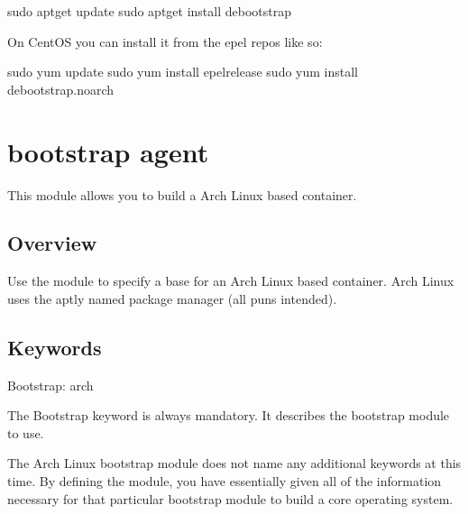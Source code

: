 \documentclass[letterpaper,10pt,english]{sphinxmanual}
\begin{document}
%
\begin{sphinxVerbatim}[commandchars=\\\{\}]
\PYGZdl{} sudo apt\PYGZhy{}get update \PYGZam{}\PYGZam{} sudo apt\PYGZhy{}get install debootstrap
\end{sphinxVerbatim}

On CentOS you can install it from the epel repos like so:

%
\begin{sphinxVerbatim}[commandchars=\\\{\}]
\PYGZdl{} sudo yum update \PYGZam{}\PYGZam{} sudo yum install epel\PYGZhy{}release \PYGZam{}\PYGZam{} sudo yum install debootstrap.noarch
\end{sphinxVerbatim}


\section{ bootstrap agent}
\label{\detokenize{appendix:arch-bootstrap-agent}}\label{\detokenize{appendix:build-arch}}\label{\detokenize{appendix:sec-build-arch}}
This module allows you to build a Arch Linux based container.


\subsection{Overview}
\label{\detokenize{appendix:id15}}
Use the  module to specify a base for an Arch Linux based container.
Arch Linux uses the aptly named  package manager (all puns intended).


\subsection{Keywords}
\label{\detokenize{appendix:id16}}
%
\begin{sphinxVerbatim}[commandchars=\\\{\}]
Bootstrap: arch
\end{sphinxVerbatim}

The Bootstrap keyword is always mandatory. It describes the bootstrap module to
use.

The Arch Linux bootstrap module does not name any additional keywords at this
time. By defining the  module, you have essentially given all of the
information necessary for that particular bootstrap module to build a core
operating system.
\end{document}
